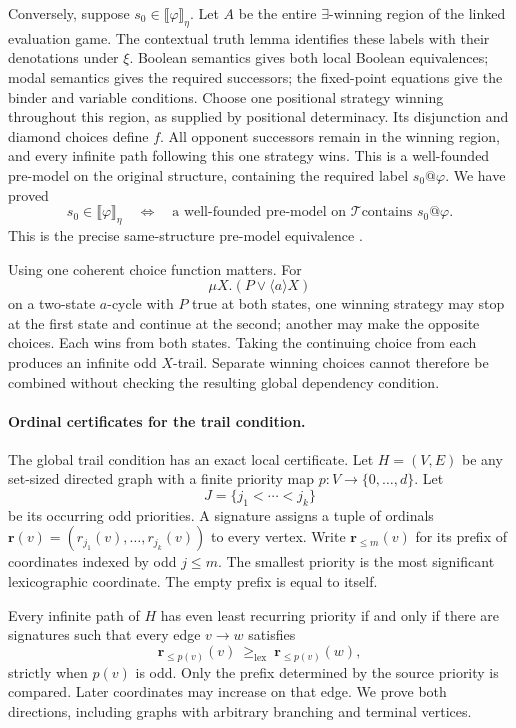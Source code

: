 Conversely, suppose
\(s_0\in\llbracket\varphi\rrbracket_\eta\).
Let \(A\) be the entire
\(\exists\)-winning region
of the linked evaluation
game. The contextual truth
lemma identifies these labels
with their denotations under
\(\xi\). Boolean semantics
gives both local Boolean
equivalences; modal semantics
gives the required successors;
the fixed-point equations
give the binder and variable
conditions.
Choose one positional strategy
winning throughout this region,
as supplied by positional
determinacy.
Its disjunction and diamond
choices define \(f\).
All opponent successors remain
in the winning region, and
every infinite path following
this one strategy wins.
This is a well-founded
pre-model on the original
structure, containing the
required label \(s_0@\varphi\).
We have proved
\[
 s_0\in\llbracket\varphi\rrbracket_\eta
 \quad\Longleftrightarrow\quad
 \text{a well-founded pre-model on \(\mathcal T\)
       contains \(s_0@\varphi\)}.
\]
This is the precise same-structure
pre-model equivalence
\cite[thms.~3.1--3.2]{BradfieldStirling2007}.

Using one coherent choice
function matters. For
\[
 \mu X.(P\lor\langle a\rangle X)
\]
on a two-state \(a\)-cycle
with \(P\) true at both
states, one winning strategy
may stop at the first
state and continue at the
second; another may make
the opposite choices.
Each wins from both states.
Taking the continuing choice
from each produces an
infinite odd \(X\)-trail.
Separate winning choices
cannot therefore be combined
without checking the resulting
global dependency condition.

\paragraph{Ordinal certificates for the trail condition.}
\label{sec:p09-mu-premodel-signatures}
The global trail condition
has an exact local certificate.
Let \(H=(V,E)\) be any
set-sized directed graph
with a finite priority map
\(p:V\to\{0,\ldots,d\}\).
Let
\[
 J=\{j_1<\cdots<j_k\}
\]
be its occurring odd priorities.
A signature assigns a tuple
of ordinals
\(\mathbf r(v)=(r_{j_1}(v),\ldots,r_{j_k}(v))\)
to every vertex.
Write \(\mathbf r_{\leq m}(v)\)
for its prefix of coordinates
indexed by odd \(j\leq m\).
The smallest priority is
the most significant
lexicographic coordinate.
The empty prefix is equal
to itself.

Every infinite path of \(H\)
has even least recurring
priority if and only if
there are signatures such
that every edge \(v\to w\)
satisfies
\[
 \mathbf r_{\leq p(v)}(v)
       \ \geq_{\mathrm{lex}}\
 \mathbf r_{\leq p(v)}(w),
\]
strictly when \(p(v)\) is odd.
Only the prefix determined
by the source priority
is compared. Later coordinates
may increase on that edge.
We prove both directions,
including graphs with
arbitrary branching and
terminal vertices.

